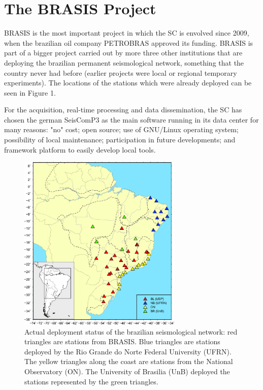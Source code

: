 \documentclass[twoside,letterpaper,twocolumn]{article}
\begin{document}
\section{The BRASIS Project}

BRASIS is the most important project in which the SC is envolved since 2009, when the brazilian oil company PETROBRAS approved its funding. BRASIS is part of a bigger project carried out by more three other institutions that are deploying the brazilian permanent seismological network, something that the country never had before (earlier projects were local or regional temporary experiments). The locations of the stations which were already deployed can be seen in Figure 1. 

For the acquisition, real-time processing and data dissemination, the SC has chosen the german SeisComP3 as the main software running in its data center for many reasons: "no" cost; open source; use of GNU/Linux operating system; possibility of local maintenance; participation in future developments; and framework platform to easily develop local tools.

\begin{figure}[h!]
\centering
\includegraphics[width=7.8cm]{images/rsb.jpg}
\caption[Figure 1]{Actual deployment status of the brazilian seismological network: red triangles are stations from BRASIS. Blue triangles are stations deployed by the Rio Grande do Norte Federal University (UFRN). The yellow triangles along the coast are stations from the National Observatory (ON). The University of Brasilia (UnB) deployed the stations represented by the green triangles. }
\end{figure}
\end{document}
